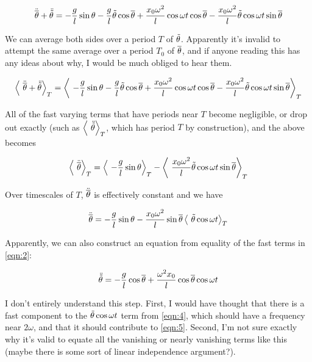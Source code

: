 \documentclass[12pt]{article}
\begin{document}
\begin{equation} \label{eq:1}
\ddot{\overline{\theta}} + \ddot{\tilde{\theta}} = -\frac{g}{l}\sin\theta  - \frac{g}{l}\tilde{\theta}\cos\overline{\theta} + \frac{x_0\omega^2}{l}\cos\omega t\cos\overline{\theta} - \frac{x_0\omega^2}{l}\tilde{\theta}\cos\omega t\sin\overline{\theta}
\end{equation}

We can average both sides over a period \(T\) of \( \tilde{\theta} \). Apparently it's invalid to attempt the same average over a period \(T_0\) of \(\overline{\theta}\), and if anyone reading this has any ideas about why, I would be much obliged to hear them.

\begin{equation}\label{eqn:2}
\left\langle\ \ddot{\overline{\theta}} + \ddot{\tilde{\theta}} \right\rangle_T = \left\langle\ -\frac{g}{l}\sin\theta  - \frac{g}{l}\tilde{\theta}\cos\overline{\theta} + \frac{x_0\omega^2}{l}\cos\omega t\cos\overline{\theta} -  \frac{x_0\omega^2}{l}\tilde{\theta}\cos\omega t\sin\overline{\theta} \right\rangle_T
\end{equation}

All of the fast varying terms that have periods near \(T\) become negligible, or drop out exactly (such as \(\left\langle\ \ddot{\tilde{\theta}} \right\rangle_T\), which has period \(T\) by construction), and the above becomes 

\begin{equation}\label{eqn:3}\left\langle\ \ddot{\overline{\theta}} \right\rangle_T = \left\langle\ -\frac{g}{l}\sin\theta \right\rangle_T - \left\langle\ \frac{x_0\omega^2}{l}\tilde{\theta}\cos\omega t\sin\overline{\theta} \right\rangle_T
\end{equation}

Over timescales of \(T\), \(\ddot{\overline{\theta}}\) is effectively constant and we have 

\begin{equation}\label{eqn:4} \ddot{\overline{\theta}} = -\frac{g}{l}\sin\theta - \frac{x_0\omega^2}{l}\sin\overline{\theta}\left\langle\ \tilde{\theta}\cos\omega t \right\rangle_T
\end{equation}

Apparently, we can also construct an equation from equality of the fast terms in \ref{eqn:2}:

\begin{equation}\label{eqn:5}
\ddot{\tilde{\theta}} = -\frac{g}{l}\cos\overline{\theta} + \frac{\omega^2x_0}{l}\cos\overline{\theta}\cos\omega t
\end{equation}

I don't entirely understand this step. First, I would have thought that there is a fast component to the \(\tilde{\theta}\cos\omega t\) term from \ref{eqn:4}, which should have a frequency near \(2\omega\), and that it should contribute to \ref{eqn:5}. Second, I'm not sure exactly why it's valid to equate all the vanishing or nearly vanishing terms like this (maybe there is some sort of linear independence argument?).
\end{document}

